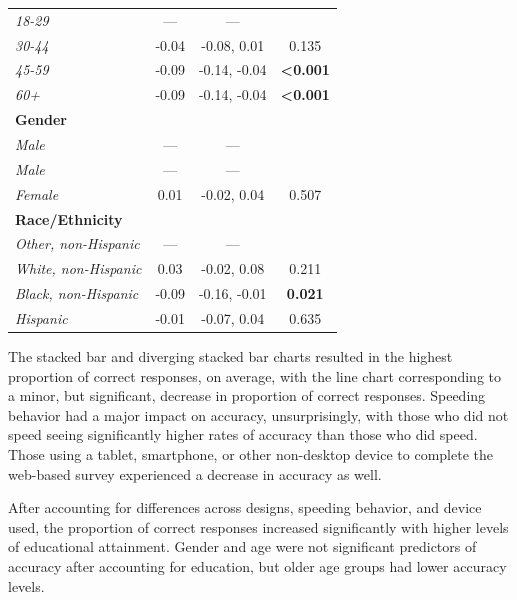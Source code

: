 \documentclass{IEEEcsmag}
\begin{document}
\begin{table}
\begin{tabular}{lccc}
\textit{18-29} & — & — & \\
\textit{30-44} & -0.04 & -0.08, 0.01 & 0.135\\
\textit{45-59} & -0.09 & -0.14, -0.04 & \textbf{<0.001}\\\textit{60+} & -0.09 & -0.14, -0.04 & \textbf{<0.001}\\
\textbf{Gender} &  &  & \\
\textit{Male} & — & — & \\
\textit{Male} & — & — & \\
\textit{Female} & 0.01 & -0.02, 0.04 & 0.507\\\textbf{Race/Ethnicity} &  &  & \\
\textit{Other, non-Hispanic} & — & — & \\
\textit{White, non-Hispanic} & 0.03 & -0.02, 0.08 & 0.211\\
\textit{Black, non-Hispanic} & -0.09 & -0.16, -0.01 & \textbf{0.021}\\
\textit{Hispanic} & -0.01 & -0.07, 0.04 & 0.635\\
\bottomrule
\end{tabular}
\end{table}

The stacked bar and diverging stacked bar charts resulted in the highest proportion of correct responses, on average, with the line chart corresponding to a minor, but significant, decrease in proportion of correct responses. Speeding behavior had a major impact on accuracy, unsurprisingly, with those who did not speed seeing significantly higher rates of accuracy than those who did speed. Those using a tablet, smartphone, or other non-desktop device to complete the web-based survey experienced a decrease in accuracy as well.

After accounting for differences across designs, speeding behavior, and device used, the proportion of correct responses increased significantly with higher levels of educational attainment. Gender and age were not significant predictors of accuracy after accounting for education, but older age groups had lower accuracy levels.
\end{document}
